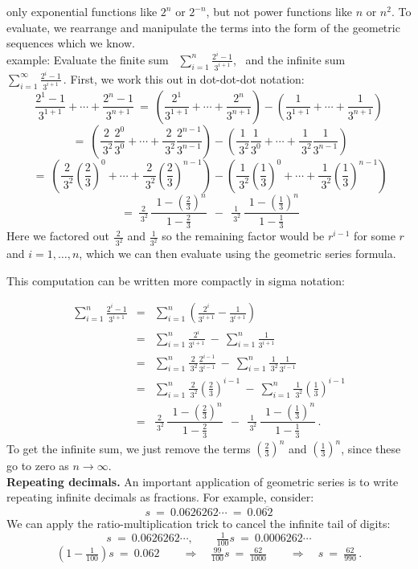 \documentclass[11pt]{article}
\newcommand{\ds}{\displaystyle}
\begin{document}
only exponential functions like $2^n$ or $2^{-n}$, but not power functions like $n$ or $n^2$.
To evaluate, we rearrange and manipulate the terms into
the form of the geometric sequences which we know.
\\[.5em]
{\sc example:} Evaluate the finite sum \
$
\ds \sum_{i=1}^n \frac{2^i-1}{3^{i+1}}
$,
\ and the infinite sum\ \
$
\ds\sum_{i=1}^\infty \frac{2^i-1}{3^{i+1}}\,.
$
First, we work this out in dot-dot-dot notation:
$$
\frac{2^1-1}{3^{1+1}} + \cdots + \frac{2^n-1}{3^{n+1}} 
\ =\
\left(\frac{2^1}{3^{1+1}} + \cdots + \frac{2^n}{3^{n+1}}\right) 
- 
\left(\frac{1}{3^{1+1}} + \cdots + \frac{1}{3^{n+1}}\right)
$$
$$
\ =\
\left(\frac{2}{\ 3^2}\frac{2^{0}}{3^{0}} + \cdots + \frac{2}{\ 3^2}\frac{2^{n-1}}{3^{n-1}}\right) 
- 
\left(\frac{1}{\ 3^2}\frac{1}{3^{0}} + \cdots + \frac{1}{\ 3^2}\frac{1}{3^{n-1}}\right)
$$
$$
\ =\
\left(\frac{2}{\ 3^2}\left(\frac23\right)^{\!0} + \cdots + \frac{2}{\ 3^2}\left(\frac23\right)^{\!n-1}\right) 
- 
\left(\frac{1}{\ 3^2}\left(\frac13\right)^{\!0} + \cdots + \frac{1}{\ 3^2}\left(\frac13\right)^{\!n-1}\right) 
$$
$$
\ =\
\tfrac2{\ 3^2}\,\frac{\ \ 1-\left(\frac23\right)^{\!n}}{1-\frac23} 
\ \ -\ \ 
\tfrac1{\ 3^2}\,\frac{\ \ 1-\left(\frac13\right)^{\!n}}{1-\frac13}
$$
Here we factored out $\frac2{\ 3^2}$ and $\frac{1}{3^2}$ so the remaining factor would be $r^{i-1}$ for some $r$ and $i=1,\ldots,n$, which we can then evaluate using the geometric series formula.

This computation can be written more compactly in sigma notation:

$$\begin{array}{rcl}
\sum\limits_{i=1}^n \frac{2^i-1}{3^{i+1}}
&=&
\sum\limits_{i=1}^n \left(\frac{2^i}{3^{i+1}}-\frac{1}{3^{i+1}}\right)
\\[1.2em]
&=&
\sum\limits_{i=1}^n \frac{2^i}{3^{i+1}}\ -\ \sum\limits_{i=1}^n\frac{1}{3^{i+1}}
\\[1.2em]
&=&
\sum\limits_{i=1}^n \frac{2}{\ 3^2}\frac{2^{i-1}}{3^{i-1}}\ -\ 
\sum\limits_{i=1}^n\frac1{\ 3^2}\frac{1}{3^{i-1}}
\\[1.2em]
&=&
\sum\limits_{i=1}^n \frac{2}{\ 3^2}\left(\frac23\right)^{\!i-1}\ -\ 
\sum\limits_{i=1}^n\frac{1}{\ 3^2}\left(\frac13\right)^{\!i-1}
\\[1.2em]
&=&
\frac2{\ 3^2}\,\dfrac{\ \ 1-\left(\frac23\right)^{\!n}}{1-\frac23} 
\ \ -\ \ 
\frac1{\ 3^2}\,\dfrac{\ \ 1-\left(\frac13\right)^{\!n}}{1-\frac13}\,.
\end{array}$$
To get the infinite sum, we just remove the terms $(\frac23)^n$ and $(\frac13)^n$,
since these go to zero as $n\to\infty$.
\\[1em]
{\bf Repeating decimals.} An important application of geometric series is to 
write repeating infinite decimals as fractions. For example, consider:
$$
s \ =\ 0.0626262\cdots  \ =\  0.0\overline{62}
$$
We can apply the ratio-multiplication trick to cancel the infinite tail of digits:
$$
s\ =\  0.0626262\cdots, \qquad
\tfrac{1}{100}s \ =\ 0.0006262\cdots 
$$
$$
(1-\tfrac{1}{100})s \ = \ 0.062 
\qquad\Longrightarrow\quad
\tfrac{99}{100}s  \ =\ \tfrac{62}{1000}
\qquad\Longrightarrow\quad
s  \ =\ \tfrac{62}{990}\,.
$$
\end{document}
